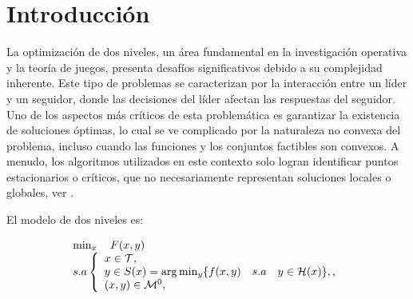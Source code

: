 \chapter{Introducción}
La optimización de dos niveles, un área fundamental en la investigación operativa y la teoría de juegos, presenta desafíos significativos debido a su complejidad inherente. Este tipo de problemas se caracterizan por la interacción entre un líder y un seguidor, donde las decisiones del líder afectan las respuestas del seguidor. Uno de los aspectos más críticos de esta problemática es garantizar la existencia de soluciones óptimas, lo cual se ve complicado por la naturaleza no convexa del problema, incluso cuando las funciones y los conjuntos factibles son convexos. A menudo, los algoritmos utilizados en este contexto solo logran identificar puntos estacionarios o críticos, que no necesariamente representan soluciones locales o globales, ver \cite{DempeyZemkoho2020}.


El modelo de dos niveles es:

\begin{equation*} 
    \begin{array}{l}
       \min_x \quad F(x, y)\\
        s.a \left\{ \begin{array}{l}
            x \in {\cal{T}}, \\
             y \in S(x) = \arg  \min_y \{ f(x, y) \quad s.a \quad y \in  {\cal{H}}(x) \},,\\
           ( x,y) \in {\cal{M}}^0, 
        \end{array}\right.
        \end{array} \end{equation*}

